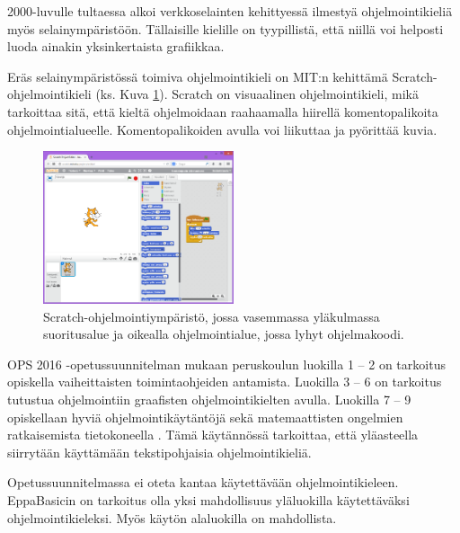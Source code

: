 2000-luvulle tultaessa alkoi
verkkoselainten kehittyessä
ilmestyä ohjelmointikieliä
myös selainympäristöön.
Tällaisille kielille on tyypillistä,
että niillä voi helposti luoda
ainakin yksinkertaista grafiikkaa.

Eräs selainympäristössä toimiva
ohjelmointikieli on
MIT:n kehittämä
Scratch-ohjelmoin\-ti\-kieli
\cite{scratch}
(ks. Kuva \ref{img:scratch}).
Scratch on visuaalinen ohjelmointikieli,
mikä tarkoittaa sitä, että
kieltä ohjelmoidaan raahaamalla
hiirellä komentopalikoita
ohjelmointialueelle.
Komentopalikoiden avulla
voi liikuttaa ja pyörittää
kuvia.

\begin{figure}[h]
    \centering
    \includegraphics[width=0.5\textwidth]{scratch}
    \caption{Scratch-ohjelmointiympäristö, jossa vasemmassa yläkulmassa suoritusalue ja oikealla ohjelmointialue, jossa lyhyt ohjelmakoodi.}
    \label{img:scratch}
\end{figure}

OPS 2016 -opetussuunnitelman
mukaan peruskoulun luokilla
1 -- 2 on tarkoitus opiskella
vaiheittaisten toimintaohjeiden
antamista.
Luokilla 3 -- 6 on tarkoitus
tutustua ohjelmointiin
graafisten ohjelmointikielten
avulla.
Luokilla 7 -- 9 opiskellaan
hyviä ohjelmointikäytäntöjä
sekä matemaattisten ongelmien
ratkaisemista tietokoneella
\cite{OPS_2016}.
Tämä käytännössä tarkoittaa,
että yläasteella siirrytään
käyttämään tekstipohjaisia
ohjelmointikieliä.

Opetussuunnitelmassa ei
oteta kantaa käytettävään
ohjelmointikieleen.
EppaBasicin on tarkoitus olla
yksi mahdollisuus yläluokilla
käytettäväksi ohjelmointikieleksi.
Myös käytön alaluokilla on
mahdollista.
